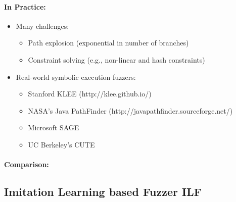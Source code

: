 \paragraph{In Practice:}
\begin{itemize}
\item Many challenges:
\begin{itemize}
    \item Path explosion (exponential in number of branches)
    \item Constraint solving (e.g., non-linear and hash constraints)
\end{itemize}{}
\item Real-world symbolic execution fuzzers:
\begin{itemize}
    \item Stanford KLEE (http://klee.github.io/)
    \item NASA’s Java PathFinder (http://javapathfinder.sourceforge.net/)
    \item Microsoft SAGE
    \item UC Berkeley’s CUTE
\end{itemize}{}
\end{itemize}{}

\paragraph{Comparison:}
\begin{minipage}{0.5\linewidth}
    \centering      
    \def\svgwidth{\linewidth}
        
\end{minipage}

\subsection{Imitation Learning based Fuzzer ILF}

\begin{minipage}{0.75\linewidth}
    \centering      
    \def\svgwidth{\linewidth}
        
\end{minipage}
